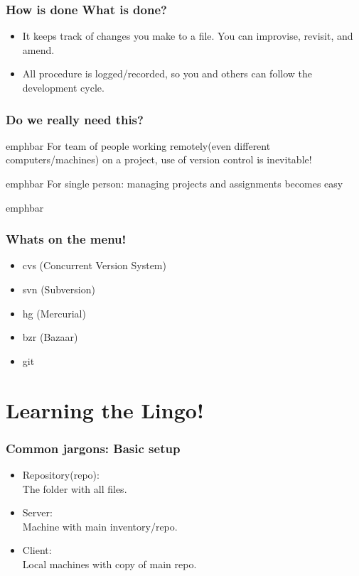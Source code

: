 \documentclass[14pt,compress]{beamer}
\newcommand{\emphbar}[1]
{\begin{beamercolorbox}[rounded=true]{emphbar} 
      {#1}
 \end{beamercolorbox}
}
\newcounter{time}
\newcommand{\inctime}[1]{\addtocounter{time}{#1}{\tiny \thetime\ m}}
\begin{document}
\begin{frame}
  \frametitle{How is done What is done?}
  \begin{itemize}
  \item It keeps track of changes you make to a file. You can improvise, revisit, and amend.
  \item All procedure is logged/recorded, so you and others can follow the development cycle.
  \end{itemize}  
\end{frame}

\begin{frame}
  \frametitle{Do we really need this?}
  \emphbar{For team of people working remotely(even different computers/machines) on a project, use of version control is inevitable!}
  \vspace{0.15in}
  \emphbar{For single person: managing projects and assignments becomes easy}
  \vspace{0.15in}
  \pause
  \emphbar{\color{red}{Its a good habit!}}
\end{frame}

\begin{frame}
  \frametitle{Whats on the menu!}
  \begin{itemize}
  \item cvs (Concurrent Version System)
  \item svn (Subversion)
  \item hg (Mercurial)
  \item bzr (Bazaar)
  \item git
  \end{itemize}
  \inctime{10}
\end{frame}

\section{Learning the Lingo!}

\begin{frame}
  \frametitle{Common jargons: Basic setup}
  \begin{itemize}
  \item Repository(repo):\\
        The folder with all files.
  \item Server:\\
        Machine with main inventory/repo.
  \item Client:\\
        Local machines with copy of main repo.
  \end{itemize}
\end{frame}
\end{document}
